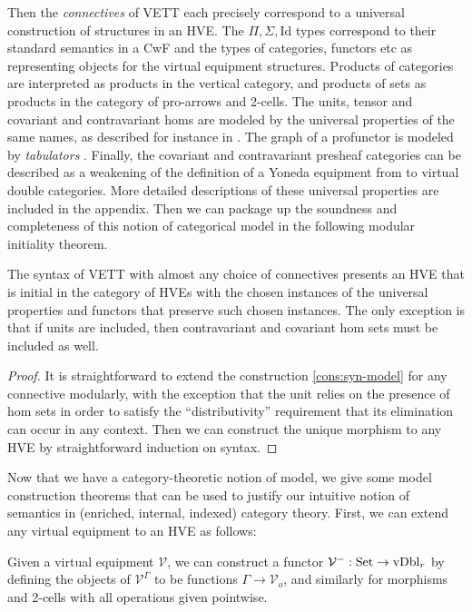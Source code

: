 \documentclass{llncs}
\begin{document}
Then the \emph{connectives} of VETT each precisely correspond to a
universal construction of structures in an HVE. The
$\Pi,\Sigma,\text{Id}$ types correspond to their standard semantics in
a CwF and the types of categories, functors etc as representing
objects for the virtual equipment structures. Products of categories
are interpreted as products in the vertical category, and products of
sets as products in the category of pro-arrows and 2-cells. The units,
tensor and covariant and contravariant homs are modeled by the
universal properties of the same names, as described for instance in
\citet{Shulman08}. The graph of a profunctor is modeled by
\emph{tabulators} \citet{grandis-pare99}. Finally, the covariant and
contravariant presheaf categories can be described as a weakening of
the definition of a Yoneda equipment from \citet{diliberti-loregian} to
virtual double categories. More detailed descriptions of these
universal properties are included in the appendix.
%
Then we can package up the soundness and completeness of this notion
of categorical model in the following modular initiality theorem.

\begin{theorem}[Initiality]
  The syntax of VETT with almost any choice of connectives presents an
  HVE that is initial in the category of HVEs with the chosen
  instances of the universal properties and functors that preserve
  such chosen instances. The only exception is that if units are
  included, then contravariant and covariant hom sets must be included
  as well.
\end{theorem}
\begin{proof}
  It is straightforward to extend the construction
  \ref{cons:syn-model} for any connective modularly, with the
  exception that the unit relies on the presence of hom sets in order
  to satisfy the ``distributivity'' requirement that its elimination
  can occur in any context. Then we can construct the unique morphism
  to any HVE by straightforward induction on syntax.
\end{proof}


Now that we have a category-theoretic notion of model, we give some
model construction theorems that can be used to justify our intuitive
notion of semantics in (enriched, internal, indexed) category theory.
%
First, we can extend any virtual equipment to an HVE as follows:
\begin{construction}
  Given a virtual equipment $\mathcal V$, we
  can construct a functor $\mathcal V^{-}: \textrm{Set} \to \text{vDbl}_r$ by
  defining the objects of $\mathcal V^\Gamma$ to be functions $\Gamma
  \to \mathcal V_o$, and similarly for morphisms and 2-cells with all
  operations given pointwise. 
\end{construction}
\end{document}
